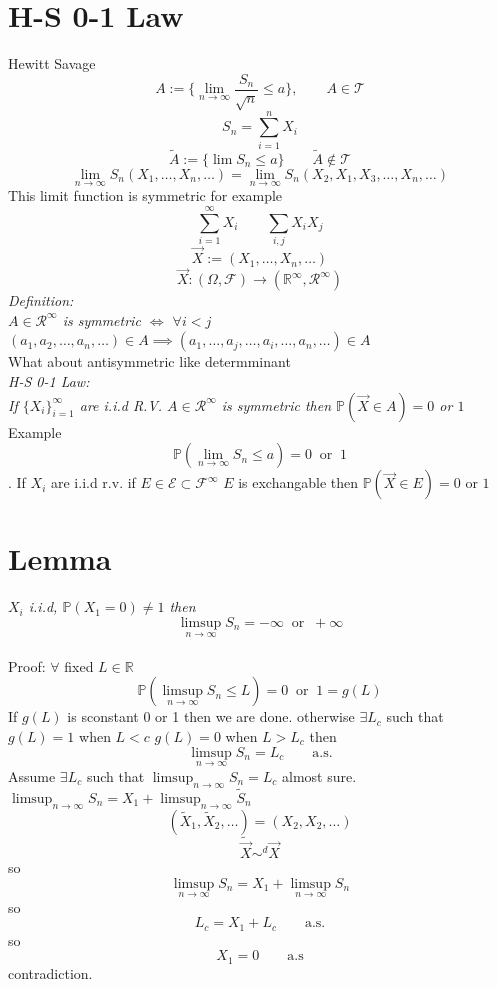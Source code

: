 \documentclass[11pt]{article}
\begin{document}
\section{H-S 0-1 Law}
Hewitt Savage
\[
    A := \{\lim_{n\to \infty}\frac{S_n}{\sqrt{n}} \le a\}, \qquad A \in \mathcal{T}
\] 
\[
S_n = \sum_{i=1}^{n}X_i
\] 
\[
    \tilde{A} := \{ \lim_{}S_n \le a\} \qquad \tilde A \not\in \mathcal{T}
\] 
\[
\lim_{n\to \infty}S_n(X_1,\dots,X_n,\dots) = \lim_{n\to \infty} S_n(X_2,X_1,X_3,\dots,X_n,\dots)
\] 
This limit function is symmetric for example
\[
\sum_{i=1}^{\infty}X_i \qquad \sum_{i,j}^{}X_iX_j
\] 
\[
\vec X := (X_1,\dots,X_n,\dots)
\] 
\[
    \vec X : (\Omega, \mathcal{F}) \rightarrow ( \mathbb{R}^{\infty}, \mathcal{R}^{\infty})
\] 
\emph{ Definition:\\
$A \in \mathcal{R}^{\infty}$  is symmetric $\iff$  $\forall i < j$ $(a_1,a_2,\dots,a_n,\dots) \in A \implies (a_1,\dots,a_j, \dots, a_i, \dots, a_n, \dots) \in A$
}\\
What about antisymmetric like determminant\\
\emph{
    H-S 0-1 Law:\\
    If $\{X_i\}_{i=1}^{\infty}$ are i.i.d R.V.  $A \in \mathcal{R}^{\infty}$ is symmetric then $  \mathbb{P}(\vec X \in A) = 0$ or $1$
}
Example
\[
    \mathbb{P}(\lim_{n\to \infty}S_n \le a) = 0 \;\; \text{or} \;\; 1
\] 
.
If $X_i$ are i.i.d r.v. if  $E \in \mathcal{E} \subset \mathcal{F}^{\infty}$ $E$ is exchangable then  $ \mathbb{P}(\vec X \in E) = 0$ or $1$
\section{Lemma}
\emph{
$X_i$ i.i.d,  $ \mathbb{P}(X_1 = 0) \ne 1$ then 
\[
    \limsup_{n\to \infty} S_n = -\infty \;\; \text{or} \;\; +\infty
\] 
}\\
Proof: $\forall$ fixed  $L \in \mathbb{R}$
\[
    \mathbb{P}(\limsup_{n\to \infty}S_n \le L) = 0 \;\; \text{or} \;\; 1 = g(L)
\] 
If  $g(L)$ is sconstant 0 or 1 then we are done.  otherwise $\exists L_c$ such that  $g(L) = 1$ when $ L < c$  $g(L) = 0$ when  $ L > L_c$ then
 \[
     \limsup_{n\to \infty} S_n = L_c \qquad \text{a.s.}
\] 
Assume $\exists L_c$ such that  $\limsup_{ n\to \infty } S_n = L_c$ almost sure. $\limsup_{n\to \infty}S_n  = X_1 + \limsup_{n\to \infty}\tilde S_n$ 
\[
    (\tilde X_1, \tilde X_2, \dots) = (X_2, X_2,\dots)
\] 
\[
    \tilde {\vec X} \sim^{d} \vec X
\] 
so
\[
\limsup_{n\to \infty} S_n = X_1 + \limsup_{n\to \infty} S_n
\] 
so
\[
    L_c = X_1 + L_c  \qquad \text{a.s.}
\] 
so
\[
    X_1 = 0 \qquad \text{a.s}
\] 
contradiction.
\end{document}
